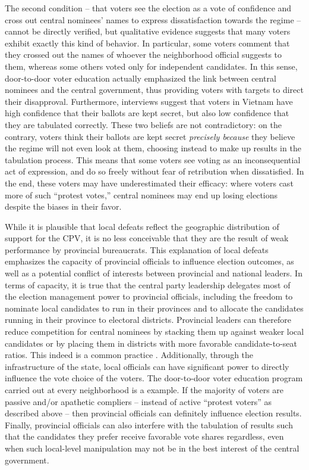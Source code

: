 \documentclass[12pt]{article}\usepackage[]{graphicx}\usepackage[]{color}
\newcommand{\1}{\mathbbm{1}}
\begin{document}
The second condition -- that voters see the election as a vote of confidence and cross out central nominees' names to express dissatisfaction towards the regime -- cannot be directly verified, but qualitative evidence suggests that many voters exhibit exactly this kind of behavior. In particular, some voters comment that they crossed out the names of whoever the neighborhood official suggests to them, whereas some others voted only for independent candidates. In this sense, door-to-door voter education actually emphasized the link between central nominees and the central government, thus providing voters with targets to direct their disapproval. Furthermore, interviews suggest that voters in Vietnam have high confidence that their ballots are kept secret, but also low confidence that they are tabulated correctly. These two beliefs are not contradictory: on the contrary, voters think their ballots are kept secret \textit{precisely because} they believe the regime will not even look at them, choosing instead to make up results in the tabulation process. This means that some voters see voting as an inconsequential act of expression, and do so freely without fear of retribution when dissatisfied. In the end, these voters may have underestimated their efficacy: where voters cast more of such ``protest votes,'' central nominees may end up losing elections despite the biases in their favor.

While it is plausible that local defeats reflect the geographic distribution of support for the CPV, it is no less conceivable that they are the result of weak performance by provincial bureaucrats. This explanation of local defeats emphasizes the capacity of provincial officials to influence election outcomes, as well as a potential conflict of interests between provincial and national leaders. In terms of capacity, it is true that the central party leadership delegates most of the election management power to provincial officials, including the freedom to nominate local candidates to run in their provinces and to allocate the candidates running in their province to electoral districts. Provincial leaders can therefore reduce competition for central nominees by stacking them up against weaker local candidates or by placing them in districts with more favorable candidate-to-seat ratios. This indeed is a common practice \cite[provided confirmatory evidence for the 2007 election, which I replicated successfully for the 2011 and 2016 elections]{MaleskySchuler2011}.  Additionally, through the infrastructure of the state, local officials can have significant power to directly influence the vote choice of the voters. The door-to-door voter education program carried out at every neighborhood is a example. If the majority of voters are passive and/or apathetic compliers -- instead of active ``protest voters'' as described above -- then provincial officials can definitely influence election results. Finally, provincial officials can also interfere with the tabulation of results such that the candidates they prefer receive favorable vote shares regardless, even when such local-level manipulation may not be in the best interest of the central government. 
\end{document}
